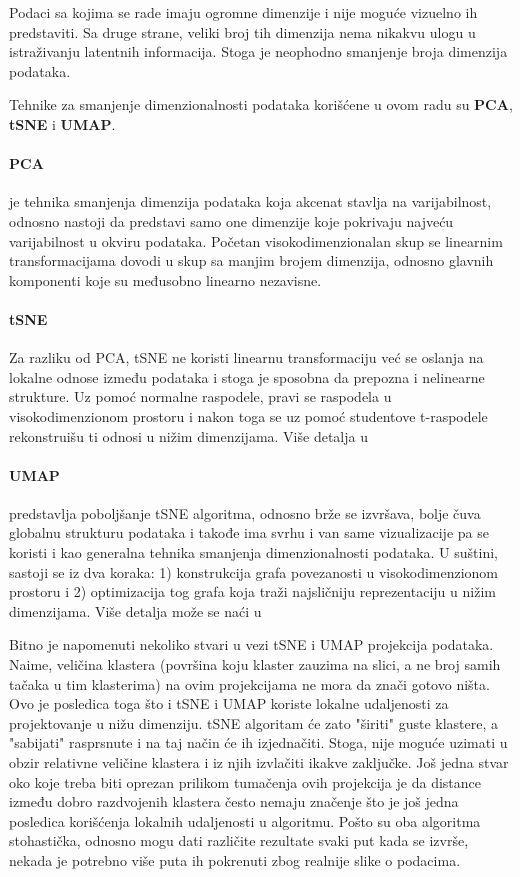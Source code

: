 \documentclass{article}
\begin{document}
Podaci sa kojima se rade imaju ogromne dimenzije i nije moguće vizuelno ih predstaviti. Sa druge strane, veliki broj tih dimenzija nema nikakvu ulogu u istraživanju latentnih informacija. Stoga je neophodno smanjenje broja dimenzija podataka. 

Tehnike za smanjenje dimenzionalnosti podataka korišćene u ovom radu su \textbf{PCA}, \textbf{tSNE} i \textbf{UMAP}.

\paragraph{PCA} je tehnika smanjenja dimenzija podataka koja akcenat stavlja na varijabilnost, odnosno nastoji da predstavi samo one dimenzije koje pokrivaju najveću varijabilnost u okviru podataka. Početan visokodimenzionalan skup se linearnim transformacijama dovodi u skup sa manjim brojem dimenzija, odnosno glavnih komponenti koje su međusobno linearno nezavisne.

\paragraph{tSNE} Za razliku od PCA, tSNE ne koristi linearnu transformaciju već se oslanja na lokalne odnose između podataka i stoga je sposobna da prepozna i nelinearne strukture. Uz pomoć normalne raspodele, pravi se raspodela u visokodimenzionom prostoru i nakon toga se uz pomoć studentove t-raspodele rekonstruišu ti odnosi u nižim dimenzijama. Više detalja u \cite{maaten2008visualizing, wattenberg2016how}

\paragraph{UMAP} predstavlja poboljšanje tSNE algoritma, odnosno brže se izvršava, bolje čuva globalnu strukturu podataka i takođe ima svrhu i van same vizualizacije pa se koristi i kao generalna tehnika smanjenja dimenzionalnosti podataka. U suštini, sastoji se iz dva koraka: 1) konstrukcija grafa povezanosti u visokodimenzionom prostoru i 2) optimizacija tog grafa koja traži najsličniju reprezentaciju u nižim dimenzijama. Više detalja može se naći u \cite{mcinnes2018umap, umapexplain}

Bitno je napomenuti nekoliko stvari u vezi tSNE i UMAP projekcija podataka. Naime, veličina klastera (površina koju klaster zauzima na slici, a ne broj samih tačaka u tim klasterima) na ovim projekcijama ne mora da znači gotovo ništa. Ovo je posledica toga što i tSNE i UMAP koriste lokalne udaljenosti za projektovanje u nižu dimenziju. tSNE algoritam će zato "širiti" guste klastere, a "sabijati" rasprsnute i na taj način će ih izjednačiti. Stoga, nije moguće uzimati u obzir relativne veličine klastera i iz njih izvlačiti ikakve zaključke. Još jedna stvar oko koje treba biti oprezan prilikom tumačenja ovih projekcija je da distance između dobro razdvojenih klastera često nemaju značenje što je još jedna posledica korišćenja lokalnih udaljenosti u algoritmu. Pošto su oba algoritma stohastička, odnosno mogu dati različite rezultate svaki put kada se izvrše, nekada je potrebno više puta ih pokrenuti zbog realnije slike o podacima.
\end{document}
